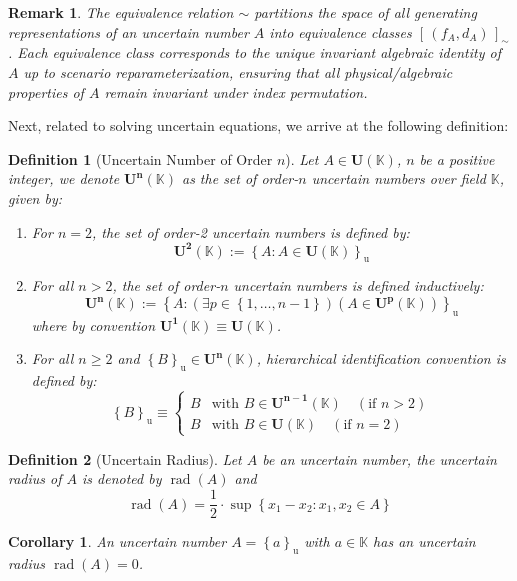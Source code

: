 \documentclass[a4paper,12pt, twoside]{memoir}
\newtheorem{definition}{Definition}[chapter]
\newtheorem{corollary}{Corollary}[chapter]
\newtheorem{remark}{Remark}[chapter]
\DeclareMathOperator{\rad}{rad}
\newcommand{\set}[1]{\left\{#1\right\}} %
\newcommand{\s}[1]{\set{#1}_\mathrm{u}} %
\newcommand{\tsbd}[1]{\mathbf{U}(\mathbb{#1})}
\newcommand{\tsbdcapn}[2]{\mathbf{U^{#2}}(\mathbb{#1})}
\begin{document}
\begin{remark}
	The equivalence relation $\sim$ partitions the space of all generating representations of an uncertain number $A$ into equivalence classes $[\,(f_A, d_A)\,]_\sim$. Each equivalence class corresponds to the unique invariant algebraic identity of $A$ up to scenario reparameterization, ensuring that all physical/algebraic properties of $A$ remain invariant under index permutation.
\end{remark}
Next, related to solving uncertain equations, we arrive at the following definition:

\begin{definition}[Uncertain Number of Order $n$]
	Let $A \in \tsbd{K}$, $n$ be a positive integer, we denote $\tsbdcapn{K}{n}$ as the set of order-$n$ uncertain numbers over field $\mathbb{K}$, given by:
	\begin{enumerate}[leftmargin=*]
		\item For $n = 2$, the set of order-2 uncertain numbers is defined by:
		      \[
			      \tsbdcapn{K}{2} := \s{A : A \in \tsbd{K}}
		      \]
		\item For all $n > 2$, the set of order-$n$ uncertain numbers is defined inductively:
		      \[
			      \tsbdcapn{K}{n} := \s{A : (\exists p \in \set{1, \dots, n-1})(A \in \tsbdcapn{K}{p})}
		      \]
		      where by convention $\tsbdcapn{K}{1} \equiv \tsbd{K}$.
		\item For all $n \geq 2$ and $\s{B} \in \tsbdcapn{K}{n}$, hierarchical identification convention is defined by:
		      \[
			      \s{B} \equiv \begin{cases}
				      B & \text{with } B \in \tsbdcapn{K}{n-1} \quad (\text{if } n > 2) \\
				      B & \text{with } B \in \tsbd{K} \quad (\text{if } n = 2)
			      \end{cases}
		      \]
	\end{enumerate}
\end{definition}

\begin{definition}[Uncertain Radius]
	Let $A$ be an uncertain number, the uncertain radius of $A$ is denoted by $\rad(A)$ and
	$$\rad(A) = \frac{1}{2} \cdot \sup \set{x_1 - x_2 : x_1, x_2 \in A}$$
\end{definition}

\begin{corollary}
	An uncertain number $A = \s{a}$ with $a \in \mathbb{K}$ has an uncertain radius $\rad(A) = 0$.
\end{corollary}
\end{document}
